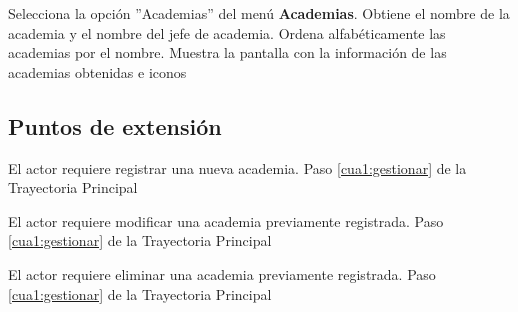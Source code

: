 \begin{UCtrayectoria}
	
	\UCpaso [\UCactor] Selecciona la opción ''Academias'' del menú \textbf{Academias}. %
	\UCpaso [\UCsist] Obtiene el nombre de la academia y el nombre del jefe de academia.
	\UCpaso [\UCsist] Ordena alfabéticamente las academias por el nombre.
	\UCpaso[\UCsist] Muestra la pantalla  con la información de las academias obtenidas e iconos %
	\label{cua1:gestionar}
\end{UCtrayectoria}

\subsection{Puntos de extensión}

\UCExtensionPoint 
{El actor requiere registrar una nueva academia.}
{Paso \ref{cua1:gestionar} de la Trayectoria Principal}
{}

\UCExtensionPoint 
{El actor requiere modificar una academia previamente registrada.}
{Paso \ref{cua1:gestionar} de la Trayectoria Principal}
{}

\UCExtensionPoint 
{El actor requiere eliminar una academia previamente registrada.}
{Paso \ref{cua1:gestionar} de la Trayectoria Principal}
{}



